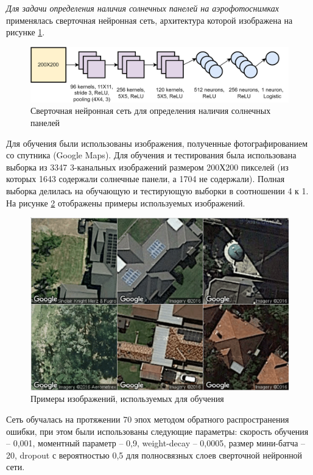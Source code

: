\documentclass{thesisby}
\begin{document}
\textit{Для задачи определения наличия солнечных панелей на аэрофотоснимках} применялась сверточная нейронная сеть, архитектура которой изображена на рисунке \ref{fig:used_cnn}.
 
\begin{figure}[ht]
	\centering
	\includegraphics[width=17cm]{man-source/images/ch4/pic4-19.png}
	\caption{Сверточная нейронная сеть для определения наличия солнечных панелей}
	\label{fig:used_cnn}
\end{figure}

Для обучения были использованы изображения, полученные фотографированием со спутника (Google Maps). Для обучения и тестирования была использована выборка из 3347 3-канальных изображений размером 200Х200 пикселей (из которых 1643 содержали солнечные панели, а 1704 не содержали). Полная выборка делилась на обучающую и тестирующую выборки в соотношении 4 к 1. На рисунке \ref{fig:google_maps} отображены примеры используемых изображений.
 
\begin{figure}[ht]
	\centering
	\includegraphics[width=12cm]{man-source/images/ch4/pic4-17.png}
	\caption{Примеры изображений, используемых для обучения}
	\label{fig:google_maps}
\end{figure}

Сеть обучалась на протяжении 70 эпох методом обратного распространения ошибки, при этом были использованы следующие параметры: скорость обучения -- 0,001, моментный параметр -- 0,9, weight-decay -- 0,0005, размер мини-батча -- 20, dropout с вероятностью 0,5 для полносвязных слоев сверточной нейронной сети.
	
\end{document}
